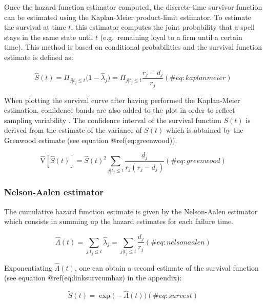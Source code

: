 \documentclass[
]{book}
\begin{document}
Once the hazard function estimator computed, the discrete-time survivor function can be estimated using the Kaplan-Meier product-limit estimator. To estimate the survival at time \(t\), this estimator computes the joint probability that a spell stays in the same state until \(t\) (e.g.~remaining loyal to a firm until a certain time). This method is based on conditional probabilities and the survival function estimate is defined as:

\begin{equation}
  \hat{S}(t) = \Pi_{j|t_j \leq t} \big(1-\hat{\lambda}_j\big) = \Pi_{j|t_j \leq t}\frac{r_j - d_j}{r_j}
  (\#eq:kaplanmeier)
\end{equation}

When plotting the survival curve after having performed the Kaplan-Meier estimation, confidence bands are also added to the plot in order to reflect sampling variability \citep{CAMERON_TRIVEDI}. The confidence interval of the survival function \(S(t)\) is derived from the estimate of the variance of \(S(t)\) which is obtained by the Grenwood estimate (see equation @ref(eq:greenwood)).

\begin{equation}
  \hat{\mathrm{V}}[\hat{S}(t)] = \hat{S}(t)^2 \sum_{j|t_j \leq t} \frac{d_j}{r_j(r_j-d_j)}
  (\#eq:greenwood)
\end{equation}

\hypertarget{nelson-aalen-estimator}{%
\subsubsection*{Nelson-Aalen estimator}\label{nelson-aalen-estimator}}

The cumulative hazard function estimate is given by the Nelson-Aalen estimator which consists in summing up the hazard estimates for each failure time.

\begin{equation}
  \hat{\Lambda}(t) = \sum_{j | t_j \leq t} \hat{\lambda}_{j} = \sum_{j | t_j \leq t} \frac{d_j}{r_j}
  (\#eq:nelsonaalen)
\end{equation}

Exponentiating \(\hat{\Lambda}(t)\), one can obtain a second estimate of the survival function (see equation @ref(eq:linksurvcumhaz) in the appendix):

\begin{equation}
    \tilde{S}(t) = \exp \big( -\hat{\Lambda}(t) \big)
    (\#eq:survest)
\end{equation}
\end{document}
